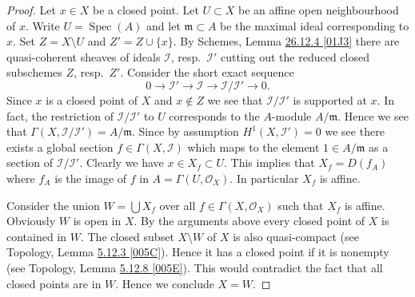 \documentclass[UTF8,11pt]{ctexart}
\newcommand{\Spec}{\operatorname{Spec}}
\newcommand{\stacksref}[2]{\href{https://stacks.math.columbia.edu/tag/#1}{#2 [#1]}}
\begin{document}
\begin{proof}
Let $x \in X$ be a closed point. Let $U \subset X$ be an affine open
neighbourhood of $x$. Write $U = \Spec(A)$ and let
$\mathfrak m \subset A$ be the maximal ideal corresponding to $x$.
Set $Z = X \setminus U$ and $Z' = Z \cup \{x\}$.
By Schemes, Lemma \stacksref{01J3}{26.12.4} there
are quasi-coherent sheaves of ideals
$\mathcal{I}$, resp.\ $\mathcal{I}'$ cutting out
the reduced closed subschemes $Z$, resp.\ $Z'$.
Consider the short exact sequence
$$
0 \to \mathcal{I}' \to \mathcal{I} \to \mathcal{I}/\mathcal{I}' \to 0.
$$
Since $x$ is a closed point of $X$ and $x \not \in Z$ we see that
$\mathcal{I}/\mathcal{I}'$ is supported at $x$. In fact, the restriction
of $\mathcal{I}/\mathcal{I'}$ to $U$ corresponds to the $A$-module
$A/\mathfrak m$. Hence we see that $\Gamma(X, \mathcal{I}/\mathcal{I'})
= A/\mathfrak m$. Since by assumption $H^1(X, \mathcal{I}') = 0$
we see there exists a global section $f \in \Gamma(X, \mathcal{I})$
which maps to the element $1 \in A/\mathfrak m$ as a section of
$\mathcal{I}/\mathcal{I'}$. Clearly we have
$x \in X_f \subset U$. This implies that $X_f = D(f_A)$ where
$f_A$ is the image of $f$ in $A = \Gamma(U, \mathcal{O}_X)$.
In particular $X_f$ is affine.

\medskip\noindent
Consider the union $W = \bigcup X_f$ over all $f \in \Gamma(X, \mathcal{O}_X)$
such that $X_f$ is affine. Obviously $W$ is open in $X$.
By the arguments above every closed point of
$X$ is contained in $W$. The closed subset $X \setminus W$ of $X$
is also quasi-compact
(see Topology, Lemma \stacksref{005C}{5.12.3}).
Hence it has a closed point if it is nonempty (see
Topology, Lemma \stacksref{005E}{5.12.8}).
This would contradict the fact that all closed points are in
$W$. Hence we conclude $X = W$.


\end{proof}
\end{document}
